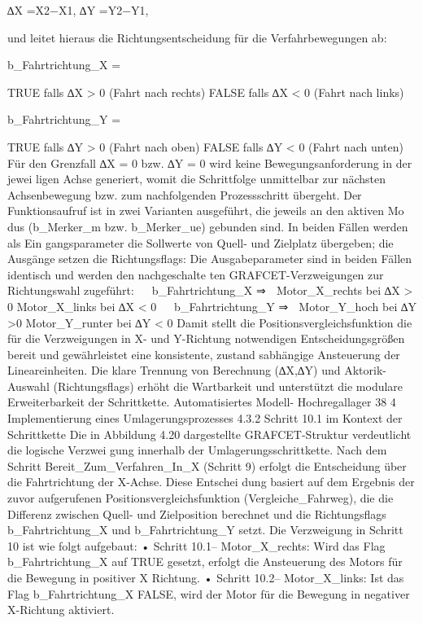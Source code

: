 \iffalse
∆X =X2−X1, ∆Y =Y2−Y1,

und leitet hieraus die Richtungsentscheidung für die Verfahrbewegungen ab:

b\_Fahrtrichtung\_X =

TRUE falls ∆X > 0 (Fahrt nach rechts)
FALSE falls ∆X < 0 (Fahrt nach links)


b\_Fahrtrichtung\_Y =

TRUE falls ∆Y > 0 (Fahrt nach oben)
FALSE falls ∆Y < 0 (Fahrt nach unten)
Für den Grenzfall ∆X = 0 bzw. ∆Y = 0 wird keine Bewegungsanforderung in der jewei
ligen Achse generiert, womit die Schrittfolge unmittelbar zur nächsten Achsenbewegung
bzw. zum nachfolgenden Prozessschritt übergeht.
Der Funktionsaufruf ist in zwei Varianten ausgeführt, die jeweils an den aktiven Mo
dus (b_Merker_m bzw. b_Merker_ue) gebunden sind. In beiden Fällen werden als Ein
gangsparameter die Sollwerte von Quell- und Zielplatz übergeben; die Ausgänge setzen
die Richtungsflags:
Die Ausgabeparameter sind in beiden Fällen identisch und werden den nachgeschalte
ten GRAFCET-Verzweigungen zur Richtungswahl zugeführt:


b_Fahrtrichtung_X ⇒

Motor_X_rechts bei ∆X > 0
Motor_X_links bei ∆X < 0


b_Fahrtrichtung_Y ⇒

Motor_Y_hoch
bei ∆Y >0
Motor_Y_runter bei ∆Y < 0
Damit stellt die Positionsvergleichsfunktion die für die Verzweigungen in X- und Y-Richtung
notwendigen Entscheidungsgrößen bereit und gewährleistet eine konsistente, zustand
sabhängige Ansteuerung der Lineareinheiten. Die klare Trennung von Berechnung
(∆X,∆Y) und Aktorik-Auswahl (Richtungsflags) erhöht die Wartbarkeit und unterstützt
die modulare Erweiterbarkeit der Schrittkette.
Automatisiertes Modell- Hochregallager
38
4 Implementierung eines Umlagerungsprozesses
4.3.2 Schritt 10.1 im Kontext der Schrittkette
Die in Abbildung 4.20 dargestellte GRAFCET-Struktur verdeutlicht die logische Verzwei
gung innerhalb der Umlagerungsschrittkette. Nach dem Schritt Bereit_Zum_Verfahren_In_X
(Schritt 9) erfolgt die Entscheidung über die Fahrtrichtung der X-Achse. Diese Entschei
dung basiert auf dem Ergebnis der zuvor aufgerufenen Positionsvergleichsfunktion
(Vergleiche_Fahrweg), die die Differenz zwischen Quell- und Zielposition berechnet
und die Richtungsflags b_Fahrtrichtung_X und b_Fahrtrichtung_Y setzt.
Die Verzweigung in Schritt 10 ist wie folgt aufgebaut:
• Schritt 10.1– Motor_X_rechts: Wird das Flag b_Fahrtrichtung_X auf TRUE
gesetzt, erfolgt die Ansteuerung des Motors für die Bewegung in positiver X
Richtung.
• Schritt 10.2– Motor_X_links: Ist das Flag b_Fahrtrichtung_X FALSE, wird der
Motor für die Bewegung in negativer X-Richtung aktiviert.
